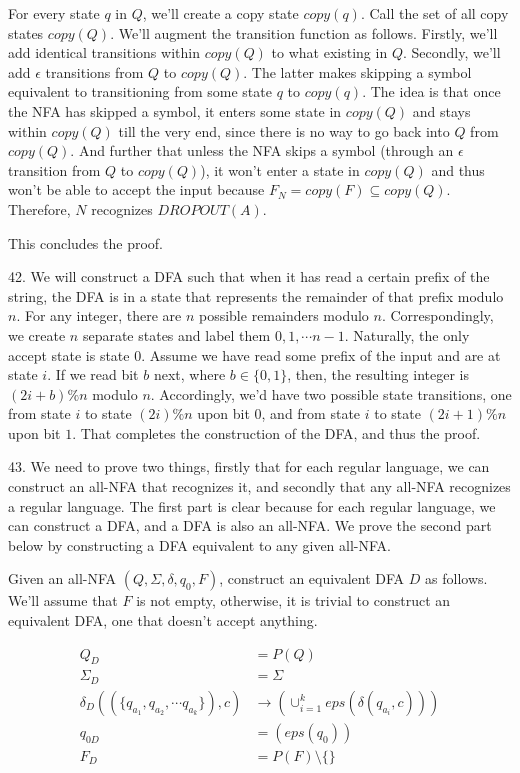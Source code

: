 \documentclass{article}
\begin{document}
For every state $q$ in $Q$, we'll create a copy state $copy(q)$. Call the set of all copy states $copy(Q)$. We'll augment the transition function as follows. Firstly, we'll add identical transitions within $copy(Q)$ to what existing in $Q$. Secondly, we'll add $\epsilon$ transitions from $Q$ to $copy(Q)$. The latter makes skipping a symbol equivalent to transitioning from some state $q$ to $copy(q)$. The idea is that once the NFA has skipped a symbol, it enters some state in $copy(Q)$ and stays within $copy(Q)$ till the very end, since there is no way to go back into $Q$ from $copy(Q)$. And further that unless the NFA skips a symbol (through an $\epsilon$ transition from $Q$ to $copy(Q)$), it won't enter a state in $copy(Q)$ and thus won't be able to accept the input because $F_N = copy(F) \subseteq copy(Q)$. Therefore, $N$ recognizes $DROPOUT(A)$.

This concludes the proof.

42. We will construct a DFA such that when it has read a certain prefix of the string, the DFA is in a state that represents the remainder of that prefix modulo $n$. For any integer, there are $n$ possible remainders modulo $n$. Correspondingly, we create $n$ separate states and label them $0, 1, \cdots {n - 1}$. Naturally, the only accept state is state $0$. Assume we have read some prefix of the input and are at state $i$. If we read bit $b$ next, where $b \in \{0, 1\}$, then, the resulting integer is $(2i + b) \% n$ modulo $n$. Accordingly, we'd have two possible state transitions, one from state $i$ to state $(2i) \% n$ upon bit $0$, and from state $i$ to state $(2i + 1) \% n$ upon bit $1$. That completes the construction of the DFA, and thus the proof.

43. We need to prove two things, firstly that for each regular language, we can construct an all-NFA that recognizes it, and secondly that any all-NFA recognizes a regular language. The first part is clear because for each regular language, we can construct a DFA, and a DFA is also an all-NFA. We prove the second part below by constructing a DFA equivalent to any given all-NFA.

Given an all-NFA $(Q, \Sigma, \delta, q_0, F)$, construct an equivalent DFA $D$ as follows. We'll assume that $F$ is not empty, otherwise, it is trivial to construct an equivalent DFA, one that doesn't accept anything.

\begin{align*}
    Q_D                                                  &= P(Q) \\
    \Sigma_D                                             &= \Sigma \\
    \delta_D((\{q_{a_1}, q_{a_2}, \cdots q_{a_k}\}), c)  &\rightarrow (\cup_{i=1}^k eps(\delta(q_{a_i}, c))) \\
    q_{0D}                                               &= (eps(q_0)) \\
    F_D                                                  &= P(F) \setminus \{\}
\end{align*}
\end{document}
